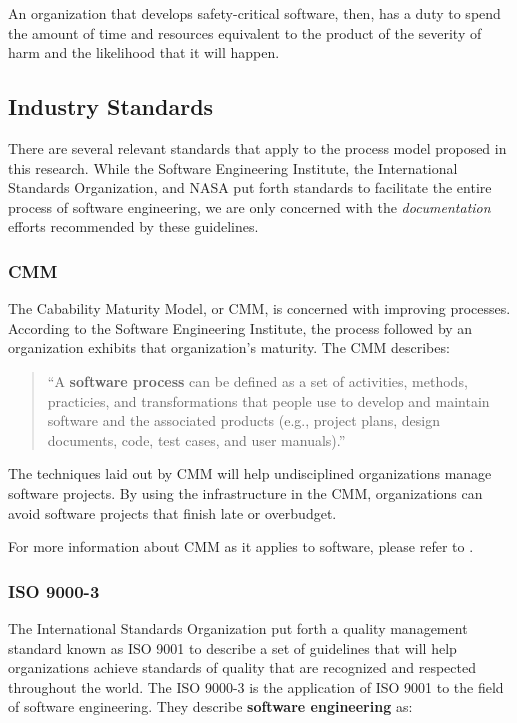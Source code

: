 An organization that develops safety-critical software, then, has a duty to
spend the amount of time and resources equivalent to the product of the severity
of harm and the likelihood that it will happen.

\subsection{Industry Standards}
There are several relevant standards that apply to the process model proposed in
this research. While the Software Engineering Institute, the International
Standards Organization, and NASA put forth standards to facilitate the entire
process of software engineering, we are only concerned with the 
\textit{documentation} efforts recommended by these guidelines.

\subsubsection{CMM}
The Cabability Maturity Model, or CMM, is concerned with improving processes.
According to the Software Engineering Institute, the process followed by an
organization exhibits that organization's maturity. The CMM describes:

\begin{quote}\label{process}
``A \textbf{software process} can be defined as a set of activities, methods,
practicies, and transformations that people use to develop and maintain software
and the associated products (e.g., project plans, design documents, code, test
cases, and user manuals).'' \cite{CMM11}
\end{quote}

The techniques laid out by CMM will help undisciplined organizations manage
software projects. By using the infrastructure in the CMM, organizations can 
avoid software projects that finish late or overbudget.

For more information about CMM as it applies to software, please refer to
\cite{CMM11}.

\subsubsection{ISO 9000-3}
The International Standards Organization put forth a quality management standard
known as ISO 9001 to describe a set of guidelines that will help organizations
achieve standards of quality that are recognized and respected throughout the
world. The ISO 9000-3 is the application of ISO 9001 to the field of software
engineering. They describe \textbf{software engineering} as: 

